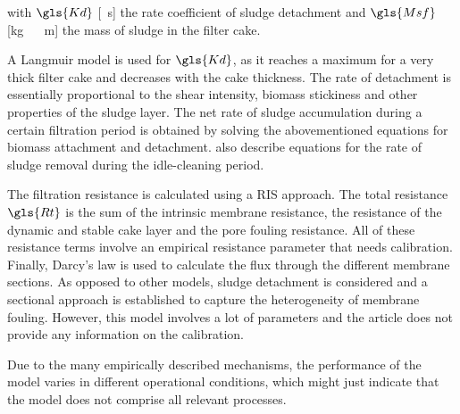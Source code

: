with $\gls{Kd}$ [\unit{\reciprocal\second}] the rate coefficient of sludge detachment and $\gls{Msf}$ [\unit{\kilogram\, \rpsquare\metre}] the mass of sludge in the filter cake. \par
A Langmuir model is used for $\gls{Kd}$, as it reaches a maximum for a very thick filter cake and decreases with the cake thickness. The rate of detachment is essentially proportional to the shear intensity, biomass stickiness and other properties of the sludge layer. The net rate of sludge accumulation during a certain filtration period is obtained by solving the abovementioned equations for biomass attachment and detachment. \cite{Li2006} also describe equations for the rate of sludge removal during the idle-cleaning period. \par
The filtration resistance is calculated using a \gls{RIS} approach. The total resistance $\gls{Rt}$ is the sum of the intrinsic membrane resistance, the resistance of the dynamic and stable cake layer and the pore fouling resistance. All of these resistance terms involve an empirical resistance parameter that needs calibration. Finally, Darcy's law is used to calculate the flux through the different membrane sections. As opposed to other models, sludge detachment is considered and a sectional approach is established to capture the heterogeneity of membrane fouling. However, this model involves a lot of parameters and the article does not provide any information on the calibration. \par
Due to the many empirically described mechanisms, the performance of the model varies in different operational conditions, which might just indicate that the model does not comprise all relevant processes.
%
